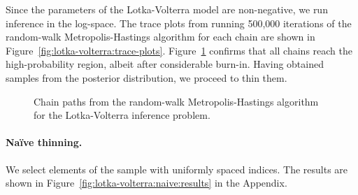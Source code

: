 \documentclass[11pt,a4paper]{report}
\begin{document}
Since the parameters of the Lotka-Volterra model are non-negative, we run inference in the log-space. The trace plots from running 500,000 iterations of the random-walk Metropolis-Hastings algorithm for each chain are shown in Figure~\ref{fig:lotka-volterra:trace-plots}. Figure~\ref{fig:lotka-volterra:chain-paths} confirms that all chains reach the high-probability region, albeit after considerable burn-in. Having obtained samples from the posterior distribution, we proceed to thin them.

\begin{figure}[h]
\centering
{}
\caption{Chain paths from the random-walk Metropolis-Hastings algorithm for the Lotka-Volterra inference problem.
\label{fig:lotka-volterra:chain-paths}}
\end{figure}

\paragraph{Na\"ive thinning.} We select elements of the sample with uniformly spaced indices. The results are shown in Figure~\ref{fig:lotka-volterra:naive:results} in the Appendix.
\end{document}
